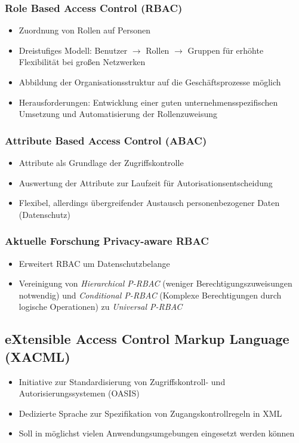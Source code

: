 \subsubsection{Role Based Access Control (RBAC)}
\begin{itemize}
	\item Zuordnung von Rollen auf Personen
	\item Dreistufiges Modell: Benutzer $\rightarrow$ Rollen $\rightarrow$ Gruppen für erhöhte Flexibilität bei großen Netzwerken
	\item Abbildung der Organisationsstruktur auf die Geschäftsprozesse möglich
	\item Herausforderungen: Entwicklung einer guten unternehmensspezifischen Umsetzung und Automatisierung der Rollenzuweisung
\end{itemize}

\subsubsection{Attribute Based Access Control (ABAC)}
\begin{itemize}
	\item Attribute als Grundlage der Zugriffskontrolle
	\item Auswertung der Attribute zur Laufzeit für Autorisationsentscheidung
	\item Flexibel, allerdings übergreifender Austausch personenbezogener Daten (Datenschutz)
\end{itemize}

\subsubsection{Aktuelle Forschung Privacy-aware RBAC}
\begin{itemize}
	\item Erweitert RBAC um Datenschutzbelange
	\item Vereinigung von \textit{Hierarchical P-RBAC} (weniger Berechtigungszuweisungen notwendig) und \textit{Conditional P-RBAC} (Komplexe Berechtigungen durch logische Operationen) zu \textit{Universal P-RBAC}
\end{itemize}


\subsection{eXtensible Access Control Markup Language (XACML)}
\begin{itemize}
	\item Initiative zur Standardisierung von Zugriffskontroll- und Autorisierungssystemen (OASIS)
	\item Dedizierte Sprache zur Spezifikation von Zugangskontrollregeln in XML
	\item Soll in möglichst vielen Anwendungsumgebungen eingesetzt werden können
\end{itemize}

